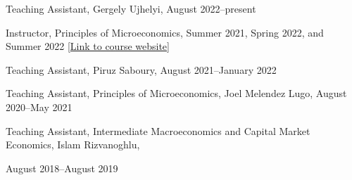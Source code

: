 \documentclass[10pt,letterpaper]{article}
\renewenvironment{itemize}{
  \begin{list}{}{
    \setlength{\leftmargin}{1.5em}
  }
}{
  \end{list}
}
\begin{document}
\begin{itemize}
  \item Teaching Assistant, Gergely Ujhelyi,
  August 2022--present
\item Instructor, Principles of Microeconomics, Summer 2021, Spring 2022, and Summer 2022 [\href{https://hussainhadah.com/courses/econ2304/}{Link to course website}]
\item Teaching Assistant, Piruz Saboury,
  August 2021--January 2022
\item Teaching Assistant, Principles of Microeconomics, Joel Melendez Lugo,
  August 2020--May 2021
\item Teaching Assistant, Intermediate Macroeconomics and  Capital Market Economics, Islam Rizvanoghlu, 

\qquad August 2018--August 2019
\end{itemize}
\end{document}
